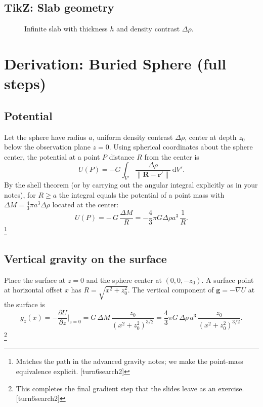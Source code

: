 \documentclass[11pt,a4paper]{article}
\begin{document}
\subsection*{TikZ: Slab geometry}
\begin{figure}[h]
\centering
{}
\caption{Infinite slab with thickness $h$ and density contrast $\Delta\rho$.}
\end{figure}

\section{Derivation: Buried Sphere (full steps)}
\subsection{Potential}
Let the sphere have radius $a$, uniform density contrast $\Delta\rho$, center at depth $z_0$ below the observation plane $z=0$. Using spherical coordinates about the sphere center, the potential at a point $P$ distance $R$ from the center is
\begin{equation}
  U(P) = -G\int_{V'} \frac{\Delta\rho}{\|\mathbf{R}-\mathbf{r'}\|}\,\mathrm{d}V'.
\end{equation}
By the shell theorem (or by carrying out the angular integral explicitly as in your notes), for $R\ge a$ the integral equals the potential of a point mass with $\Delta M=\tfrac{4}{3}\pi a^3\Delta\rho$ located at the center:
\begin{equation}
  U(P) = -\,G\,\frac{\Delta M}{R} = -\frac{4}{3}\pi G\Delta\rho a^3\,\frac{1}{R}.
\end{equation}
\footnote{Matches the path in the advanced gravity notes; we make the point-mass equivalence explicit. [turn6search2]}

\subsection{Vertical gravity on the surface}
Place the surface at $z=0$ and the sphere center at $(0,0,-z_0)$. A surface point at horizontal offset $x$ has $R=\sqrt{x^2+z_0^2}$. The vertical component of $\mathbf{g}=-\nabla U$ at the surface is
\begin{equation}
  g_z(x) = -\frac{\partial U}{\partial z}\Big|_{z=0} = G\,\Delta M\,\frac{z_0}{(x^2+z_0^2)^{3/2}} = \frac{4}{3}\pi G\,\Delta\rho\,a^3\,\frac{z_0}{(x^2+z_0^2)^{3/2}}.
\end{equation}
\footnote{This completes the final gradient step that the slides leave as an exercise. [turn6search2]}
\end{document}
